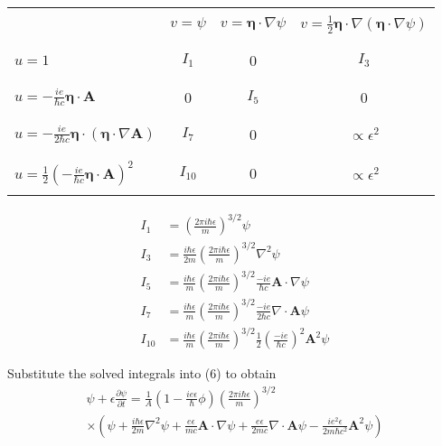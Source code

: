 \documentclass[12pt]{article}
\begin{document}
\begin{center}
\begin{tabular}{|l|c|c|c|}
\hline
& & & \\ %
& $v=\psi$ & $v=\boldsymbol\eta\cdot\nabla\psi$ & $v=\tfrac{1}{2}\boldsymbol\eta\cdot\nabla(\boldsymbol\eta\cdot\nabla\psi)$
\\
& & & \\ %
\hline
& & & \\ %
$u=1$ & $I_1$ & 0 & $I_3$
\\
& & & \\ %
\hline
& & &
\\
$\displaystyle u=-\frac{ie}{\hbar c}\boldsymbol\eta\cdot\mathbf A$ & 0 & $I_5$ & 0
\\
& & &
\\
\hline
& & & \\ %
$\displaystyle u=-\frac{ie}{2\hbar c}\boldsymbol\eta\cdot(\boldsymbol\eta\cdot\nabla\mathbf A)$ & $I_7$ & 0 & $\propto\epsilon^2$
\\
& & & \\ %
\hline
& & & \\ %
$\displaystyle u=\frac{1}{2}\left(-\frac{ie}{\hbar c}\boldsymbol\eta\cdot\mathbf A\right)^2$ & $I_{10}$ & 0 & $\propto\epsilon^2$
\\
& & & \\ %
\hline
\end{tabular}
\end{center}

\bigskip
\begin{align*}
I_1&=\left(\frac{2\pi i\hbar\epsilon}{m}\right)^{3/2}\psi
\\
I_3&=\frac{i\hbar\epsilon}{2m}\left(\frac{2\pi i\hbar\epsilon}{m}\right)^{3/2}\nabla^2\psi
\\
I_5&=\frac{i\hbar\epsilon}{m}\left(\frac{2\pi i\hbar\epsilon}{m}\right)^{3/2}
\frac{-ie}{\hbar c}\mathbf A\cdot\nabla\psi
\\
I_7&=\frac{i\hbar\epsilon}{m}
\left(\frac{2\pi i\hbar\epsilon}{m}\right)^{3/2}
\frac{-ie}{2\hbar c}\nabla\cdot\mathbf A\psi
\\
I_{10}&=\frac{i\hbar\epsilon}{m}
\left(\frac{2\pi i\hbar\epsilon}{m}\right)^{3/2}
\frac{1}{2}
\left(\frac{-ie}{\hbar c}\right)^2
\mathbf A^2\psi
\end{align*}

Substitute the solved integrals into (6) to obtain
\begin{multline*}
\psi+\epsilon\frac{\partial\psi}{\partial t}
=\frac{1}{A}
\left(1-\frac{ie\epsilon}{\hbar}\phi\right)\left(\frac{2\pi i\hbar\epsilon}{m}\right)^{3/2}
\\
\times\left(
\psi
+\frac{i\hbar\epsilon}{2m}\nabla^2\psi
+\frac{e\epsilon}{mc}\mathbf A\cdot\nabla\psi
+\frac{e\epsilon}{2mc}\nabla\cdot\mathbf A\psi
-\frac{ie^2\epsilon}{2m\hbar c^2}\mathbf A^2\psi
\right)
\end{multline*}
\end{document}
